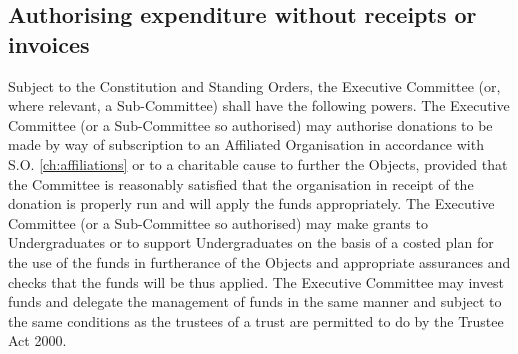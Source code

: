 \subsection{Authorising expenditure without receipts or invoices} \label{ssec:ExpenditureSansReceipt}
\npara Subject to the Constitution and Standing Orders, the Executive Committee (or, where relevant, a Sub-Committee) shall have the following powers.
\npara The Executive Committee (or a Sub-Committee so authorised) may authorise donations to be made by way of subscription to an Affiliated Organisation in accordance with S.O. \ref{ch:affiliations} or to a charitable cause to further the Objects, provided that the Committee is reasonably satisfied that the organisation in receipt of the donation is properly run and will apply the funds appropriately.
\npara The Executive Committee (or a Sub-Committee so authorised) may make grants to Undergraduates or to support Undergraduates on the basis of a costed plan for the use of the funds in furtherance of the Objects and appropriate assurances and checks that the funds will be thus applied.
\npara The Executive Committee may invest funds and delegate the management of funds in the same manner and subject to the same conditions as the trustees of a trust are permitted to do by the Trustee Act 2000. 


